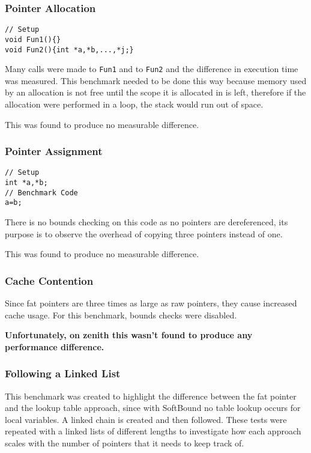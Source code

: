 \subsubsection{Pointer Allocation}


\begin{verbatim}
// Setup
void Fun1(){}
void Fun2(){int *a,*b,...,*j;}
\end{verbatim}

Many calls were made to \verb!Fun1! and to \verb!Fun2! and the difference in execution time was measured.
This benchmark needed to be done this way because memory used by an allocation is not free until the scope it is allocated in is left, therefore if the allocation were performed in a loop, the stack would run out of space.

This was found to produce no measurable difference.

\subsubsection{Pointer Assignment}

\begin{verbatim}
// Setup
int *a,*b;
// Benchmark Code
a=b;
\end{verbatim}

There is no bounds checking on this code as no pointers are dereferenced, its purpose is to observe the overhead of copying three pointers instead of one.

This was found to produce no measurable difference.

\subsubsection{Cache Contention}

Since fat pointers are three times as large as raw pointers, they cause increased cache usage.
For this benchmark, bounds checks were disabled.

\textbf{Unfortunately, on zenith this wasn't found to produce any performance difference.}

\subsubsection{Following a Linked List}

This benchmark was created to highlight the difference between the fat pointer and the lookup table approach, since with SoftBound no table lookup occurs for local variables.
A linked chain is created and then followed.
These tests were repeated with a linked lists of different lengths to investigate how each approach scales with the number of pointers that it needs to keep track of.

